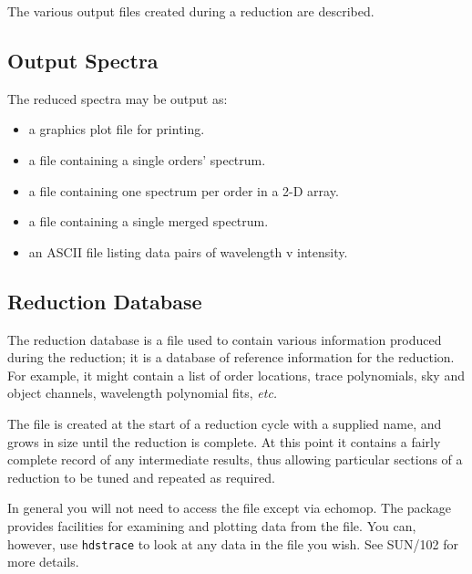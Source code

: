 \documentclass[twoside,11pt]{article}
\newcommand{\xref}[3]{#1}
\newcommand{\xlabel}[1]{}
\renewcommand{\_}{\texttt{\symbol{95}}}
\newcommand{\mlabel}[1]{\xlabel{#1}\label{#1}}
\begin{document}
The various output files created during a reduction are described.

\subsection{\mlabel{output_spectra}Output Spectra}

The reduced spectra may be output as:

\begin{itemize}

\item a graphics plot file for printing.

\item a file containing a single orders' spectrum.

\item a file containing one spectrum per order in a 2-D array.

\item a file containing a single merged spectrum.

\item an ASCII file listing data pairs of wavelength v intensity.


\end{itemize}

\subsection{Reduction Database}

The reduction database is a file used to contain
various information produced during the reduction; it is a database of
reference information for the reduction.
For example, it might contain a list of order locations,
trace polynomials, sky and object channels, wavelength polynomial fits,
{\it etc.}

The file is created at the start of a reduction cycle with a supplied name,
and grows in size until the reduction is complete.
At this point it contains a fairly complete record of any intermediate
results, thus allowing particular sections of a reduction to be tuned
and repeated as required.

In general you will not need to access the file except via {\sc echomop}.
The package provides facilities for examining and plotting data from the file.
You can, however, use \texttt{hdstrace} to look at any data in the file you wish.
See \xref{SUN/102}{sun102}{} for more details.


\end{document}
